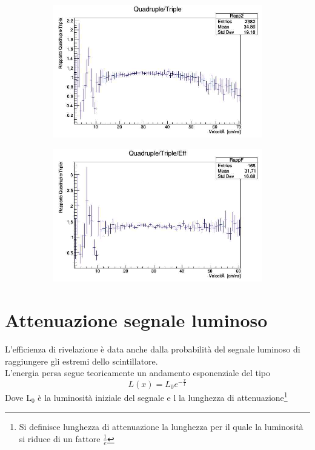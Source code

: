 \documentclass[a4paper]{article}
\begin{document}
\begin{figure}[H]
\begin{subfigure}[b]{0.4\textwidth}
\includegraphics[width=\textwidth]{./immagini/TimeOfFlight/RappPiomboFore.jpg}
\caption{}
\label{fig:RappPbFore}
\end{subfigure}
\hfill
\begin{subfigure}[b]{0.4\textwidth}
\includegraphics[width=\textwidth]{./immagini/TimeOfFlight/RappPbEffFore.jpg}
\caption{}
\label{fig:RappPbEffFore}
\end{subfigure}
\caption{}
\end{figure}

\newpage
\section{Attenuazione segnale luminoso}
\label{sec:Atte}
L'efficienza di rivelazione è data anche dalla probabilità del segnale luminoso di raggiungere gli estremi dello scintillatore.\\
L'energia persa segue teoricamente un andamento esponenziale del tipo
\begin{equation}
L(x) = L_0e^{-\frac{x}{l}}
\label{eq:AttLuce}
\end{equation}
Dove L$_0$ è la luminosità iniziale del segnale e l la lunghezza di attenuazione\footnote{Si definisce lunghezza di attenuazione la lunghezza per il quale la luminosità si riduce di un fattore $\frac{1}{e}$}
\end{document}
